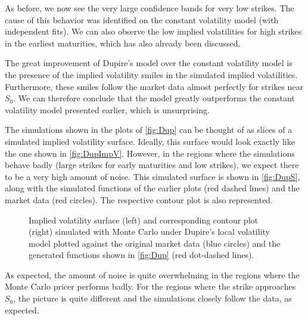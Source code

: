 As before, we now see the very large confidence bands for very low strikes. The cause of this behavior was identified on the constant volatility model (with independent fits). We can also observe the low implied volatilities for high strikes in the earliest maturities, which has also already been discussed.

The great improvement of Dupire's model over the constant volatility model is the presence of the implied volatility smiles in the simulated implied volatilities. Furthermore, these smiles follow the market data almost perfectly for strikes near $S_0$.
We can therefore conclude that the model greatly outperforms the constant volatility model presented earlier, which is unsurprising.

The simulations shown in the plots of \autoref{fig:Dup} can be thought of as slices of a simulated implied volatility surface. Ideally, this surface would look exactly like the one shown in \autoref{fig:DupImpV}. However, in the regions where the simulations behave badly (large strikes for early maturities and low strikes), we expect there to be a very high amount of noise. This simulated surface is shown in \autoref{fig:DupS}, along with the simulated functions of the earlier plots (red dashed lines) and the market data (red circles). The respective contour plot is also represented.



\begin{figure}[H]
  \begin{subfigmatrix}{2}
  \end{subfigmatrix}
    \caption[Implied volatility surface and corresponding contour plot simulated with Monte Carlo under Dupire's local volatility model plotted against the original market data and the generated functions shown in \autoref{fig:Dup}.]{Implied volatility surface (left) and corresponding contour plot (right) simulated with Monte Carlo under Dupire's local volatility model plotted against the original market data (blue circles) and the generated functions shown in \autoref{fig:Dup} (red dot-dashed lines).}\label{fig:DupS}
\end{figure}   


As expected, the amount of noise is quite overwhelming in the regions where the Monte Carlo pricer performs badly. For the regions where the strike approaches $S_0$, the picture is quite different and the simulations closely follow the data, as expected.







